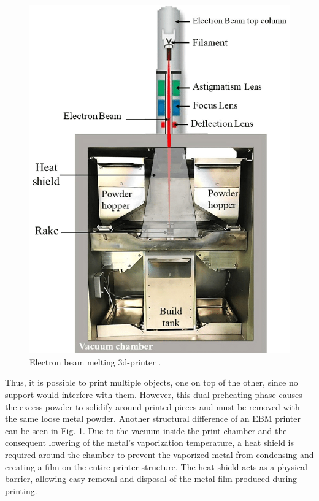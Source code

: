 \begin{figure}
    \centering
    \includegraphics[scale=0.25]{Images/A-schematic-of-electron-beam-melting-EBM.png}
    \caption[EBM 3d-printer.]{Electron beam melting 3d-printer \cite{azam_-depth_2018}.}
    \label{fig:ebm_printer}
\end{figure} 
Thus, it is possible to print multiple objects, one on top of the other, since no support would interfere with them. However, this dual preheating phase causes the excess powder to solidify around printed pieces and must be removed with the same loose metal powder. Another structural difference of an EBM printer can be seen in Fig. \ref{fig:ebm_printer}. Due to the vacuum inside the print chamber and the consequent lowering of the metal's vaporization temperature, a heat shield is required around the chamber to prevent the vaporized metal from condensing and creating a film on the entire printer structure. The heat shield acts as a physical barrier, allowing easy removal and disposal of the metal film produced during printing.
